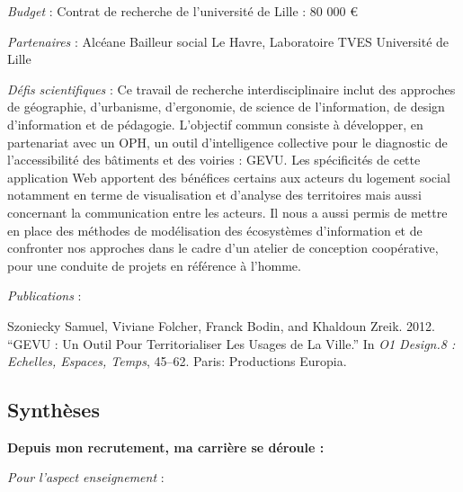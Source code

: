 \documentclass[
  a4paper,
  DIV=11,
  numbers=noendperiod]{scrreprt}
\begin{document}
\emph{Budget} : Contrat de recherche de l'université de Lille : 80 000 €

\emph{Partenaires} : Alcéane Bailleur social Le Havre, Laboratoire TVES
Université de Lille

\emph{Défis scientifiques} : Ce travail de recherche interdisciplinaire
inclut des approches de géographie, d'urbanisme, d'ergonomie, de science
de l'information, de design d'information et de pédagogie. L'objectif
commun consiste à développer, en partenariat avec un OPH, un outil
d'intelligence collective pour le diagnostic de l'accessibilité des
bâtiments et des voiries : GEVU. Les spécificités de cette application
Web apportent des bénéfices certains aux acteurs du logement social
notamment en terme de visualisation et d'analyse des territoires mais
aussi concernant la communication entre les acteurs. Il nous a aussi
permis de mettre en place des méthodes de modélisation des écosystèmes
d'information et de confronter nos approches dans le cadre d'un atelier
de conception coopérative, pour une conduite de projets en référence à
l'homme.

\emph{Publications} :

Szoniecky Samuel, Viviane Folcher, Franck Bodin, and Khaldoun Zreik.
2012. ``GEVU : Un Outil Pour Territorialiser Les Usages de La Ville.''
In \emph{O1 Design.8 : Echelles, Espaces, Temps}, 45--62. Paris:
Productions Europia.

\subsection{Synthèses}\label{synthuxe8ses}

\textbf{Depuis mon recrutement, ma carrière se déroule :}

\emph{Pour l'aspect enseignement} :
\end{document}
